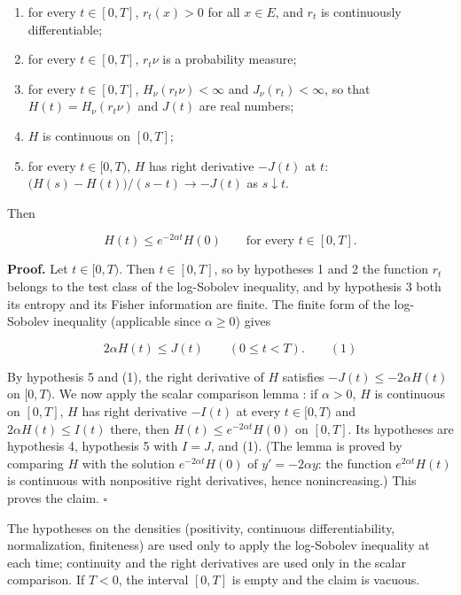 \documentclass[11pt,a4paper]{article}
\begin{document}
\begin{enumerate}


\item for every \(t\in[0,T]\), \(r_t(x)>0\) for all \(x\in E\), and \(r_t\) is continuously differentiable;

\item for every \(t\in[0,T]\), \(r_t\nu\) is a probability measure;

\item for every \(t\in[0,T]\), \(H_\nu(r_t\nu)<\infty\) and \(J_\nu(r_t)<\infty\), so that \(H(t)=H_\nu(r_t\nu)\) and \(J(t)\) are real numbers;

\item \(H\) is continuous on \([0,T]\);

\item for every \(t\in[0,T)\), \(H\) has right derivative \(-J(t)\) at \(t\): \(\bigl(H(s)-H(t)\bigr)/(s-t)\to-J(t)\) as \(s\downarrow t\).

\end{enumerate}



Then


\[H(t)\le e^{-2\alpha t}H(0)\qquad\text{for every }t\in[0,T].\]


\textbf{Proof.} Let \(t\in[0,T)\). Then \(t\in[0,T]\), so by hypotheses 1 and 2 the function \(r_t\) belongs to the test class of the log-Sobolev inequality, and by hypothesis 3 both its entropy and its Fisher information are finite. The finite form of the log-Sobolev inequality \cite[Section~3.1.4]{LangevinLean2026ULALSI} (applicable since \(\alpha\ge0\)) gives


\[2\alpha H(t)\le J(t)\qquad(0\le t<T).\qquad(1)\]


By hypothesis 5 and (1), the right derivative of \(H\) satisfies \(-J(t)\le-2\alpha H(t)\) on \([0,T)\). We now apply the scalar comparison lemma \cite[Section~3.2.2]{LangevinLean2026ULALSI}: if \(\alpha>0\), \(H\) is continuous on \([0,T]\), \(H\) has right derivative \(-I(t)\) at every \(t\in[0,T)\) and \(2\alpha H(t)\le I(t)\) there, then \(H(t)\le e^{-2\alpha t}H(0)\) on \([0,T]\). Its hypotheses are hypothesis 4, hypothesis 5 with \(I=J\), and (1). (The lemma is proved by comparing \(H\) with the solution \(e^{-2\alpha t}H(0)\) of \(y'=-2\alpha y\): the function \(e^{2\alpha t}H(t)\) is continuous with nonpositive right derivatives, hence nonincreasing.) This proves the claim. \(\square\)




The hypotheses on the densities (positivity, continuous differentiability, normalization, finiteness) are used only to apply the log-Sobolev inequality at each time; continuity and the right derivatives are used only in the scalar comparison. If \(T<0\), the interval \([0,T]\) is empty and the claim is vacuous.
\end{document}
